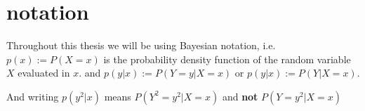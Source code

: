 


\section{notation}
Throughout this thesis we will be using Bayesian notation, i.e. $p(x) := P(X=x)$ is 
the probability density function of the random variable $X$ evaluated in $x$. 
and $p(y|x) := P(Y=y|X=x)$ or $p(y|x) := P(Y|X=x)$.

And writing $p(y^2|x)$ means $P(Y^2=y^2|X=x)$ and \textbf{not} $P(Y=y^2|X=x)$






